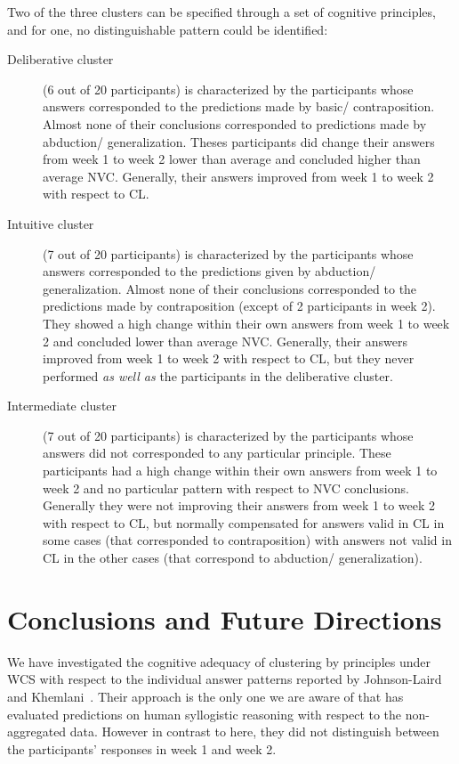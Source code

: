 \documentclass[12pt]{article}
\begin{document}
Two of the three clusters can be specified through a set of cognitive principles, and for one, no distinguishable pattern could be identified:
\begin{description}
 \item[Deliberative cluster] (6 out of 20 participants) is characterized by the participants whose answers corresponded to the predictions made by basic/ contraposition. Almost none of their conclusions corresponded to predictions made by abduction/ generalization. Theses participants did change their answers from week 1 to week 2 
 lower than average and concluded higher than average NVC. Generally, their answers improved from week 1 to week 2 with respect to CL.
 \item[Intuitive cluster] (7 out of 20 participants)
is characterized by the participants whose answers corresponded to the predictions given by abduction/ generalization. Almost none of their conclusions corresponded to the predictions made by contraposition (except of 2 participants in week 2). They showed a high change within their own answers from week 1 to week 2 
 and concluded lower than average NVC. Generally, their answers improved from week 1 to week 2 with respect to CL, but they never performed \textit{as well as} the participants in 
 the deliberative cluster.
 \item[Intermediate cluster] (7 out of 20 participants) is characterized by the participants whose answers did not corresponded to any particular principle. These participants had a high change within their own answers from week 1 to week 2
 and no particular pattern with respect to NVC conclusions. Generally they were not improving their answers from week 1 to week 2 with respect to CL, but normally compensated for answers valid in CL in some cases (that corresponded to contraposition) with answers not valid in CL in the other cases (that correspond to abduction/ generalization).
\end{description}

 \section{Conclusions and Future Directions}
 
 
We have investigated the cognitive adequacy of clustering by principles under WCS with respect to the individual answer patterns reported by Johnson-Laird and Khemlani~\cite{khemlani:2016}.
Their approach is the only one we are aware of that has evaluated predictions on human syllogistic reasoning
with respect to the non-aggregated data.
However in contrast to here, they did not distinguish between the participants' responses in week 1 and week 2.
 
\end{document}
